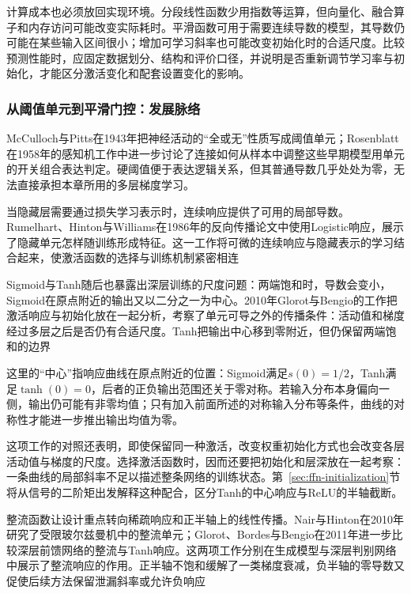 计算成本也必须放回实现环境。分段线性函数少用指数等运算，但向量化、融合算子和内存访问可能改变实际耗时。平滑函数可用于需要连续导数的模型，其导数仍可能在某些输入区间很小；增加可学习斜率也可能改变初始化时的合适尺度。比较预测性能时，应固定数据划分、结构和评价口径，并说明是否重新调节学习率与初始化，才能区分激活变化和配套设置变化的影响。

\subsubsection{从阈值单元到平滑门控：发展脉络}
\label{sec:ffn-activation-history}

McCulloch与Pitts在1943年把神经活动的“全或无”性质写成阈值单元；Rosenblatt在1958年的感知机工作中进一步讨论了连接如何从样本中调整这些早期模型用单元的开关组合表达判定。硬阈值便于表达逻辑关系，但其普通导数几乎处处为零，无法直接承担本章所用的多层梯度学习。

当隐藏层需要通过损失学习表示时，连续响应提供了可用的局部导数。Rumelhart、Hinton与Williams在1986年的反向传播论文中使用Logistic响应，展示了隐藏单元怎样随训练形成特征。这一工作将可微的连续响应与隐藏表示的学习结合起来，使激活函数的选择与训练机制紧密相连

Sigmoid与Tanh随后也暴露出深层训练的尺度问题：两端饱和时，导数会变小，Sigmoid在原点附近的输出又以二分之一为中心。2010年Glorot与Bengio的工作把激活响应与初始化放在一起分析，考察了单元可导之外的传播条件：活动值和梯度经过多层之后是否仍有合适尺度。Tanh把输出中心移到零附近，但仍保留两端饱和的边界

这里的“中心”指响应曲线在原点附近的位置：Sigmoid满足$s(0)=1/2$，Tanh满足$\tanh(0)=0$，后者的正负输出范围还关于零对称。若输入分布本身偏向一侧，输出仍可能有非零均值；只有加入前面所述的对称输入分布等条件，曲线的对称性才能进一步推出输出均值为零。

这项工作的对照还表明，即使保留同一种激活，改变权重初始化方式也会改变各层活动值与梯度的尺度。选择激活函数时，因而还要把初始化和层深放在一起考察：一条曲线的局部斜率不足以描述整条网络的训练状态。第~\ref{sec:ffn-initialization}节将从信号的二阶矩出发解释这种配合，区分Tanh的中心响应与ReLU的半轴截断。

整流函数让设计重点转向稀疏响应和正半轴上的线性传播。Nair与Hinton在2010年研究了受限玻尔兹曼机中的整流单元；Glorot、Bordes与Bengio在2011年进一步比较深层前馈网络的整流与Tanh响应。这两项工作分别在生成模型与深层判别网络中展示了整流响应的作用。正半轴不饱和缓解了一类梯度衰减，负半轴的零导数又促使后续方法保留泄漏斜率或允许负响应

